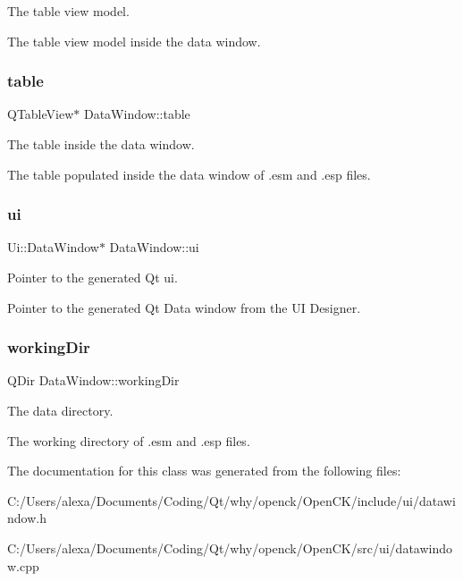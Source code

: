 The table view model. 

The table view model inside the data window. \mbox{\label{class_data_window_ade51aa7748850fd9cef283dbb771b083}} 
\subsubsection{\texorpdfstring{table}{table}}
{\footnotesize\ttfamily Q\+Table\+View$\ast$ Data\+Window\+::table\hspace{0.3cm}{\ttfamily [private]}}



The table inside the data window. 

The table populated inside the data window of .esm and .esp files. \mbox{\label{class_data_window_a4d726a6dde12dc2af17bca22573bd69b}} 
\subsubsection{\texorpdfstring{ui}{ui}}
{\footnotesize\ttfamily Ui\+::\+Data\+Window$\ast$ Data\+Window\+::ui\hspace{0.3cm}{\ttfamily [private]}}



Pointer to the generated Qt ui. 

Pointer to the generated Qt Data window from the UI Designer. \mbox{\label{class_data_window_a9681d374d6efb060c5369da1a035ec74}} 
\subsubsection{\texorpdfstring{working\+Dir}{workingDir}}
{\footnotesize\ttfamily Q\+Dir Data\+Window\+::working\+Dir\hspace{0.3cm}{\ttfamily [private]}}



The data directory. 

The working directory of .esm and .esp files. 

The documentation for this class was generated from the following files\+:\begin{DoxyCompactItemize}
\item 
C\+:/\+Users/alexa/\+Documents/\+Coding/\+Qt/why/openck/\+Open\+C\+K/include/ui/datawindow.\+h\item 
C\+:/\+Users/alexa/\+Documents/\+Coding/\+Qt/why/openck/\+Open\+C\+K/src/ui/datawindow.\+cpp\end{DoxyCompactItemize}
